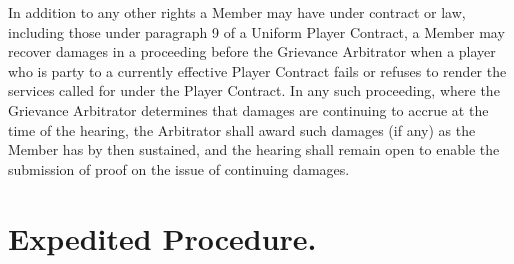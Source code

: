 \documentclass[
]{book}
\begin{document}
In addition to any other rights a Member may have under contract or law, including those under paragraph 9 of a Uniform Player Contract, a Member may recover damages in a proceeding before the Grievance Arbitrator when a player who is party to a currently effective Player Contract fails or refuses to render the services called for under the Player Contract. In any such proceeding, where the Grievance Arbitrator determines that damages are continuing to accrue at the time of the hearing, the Arbitrator shall award such damages (if any) as the Member has by then sustained, and the hearing shall remain open to enable the submission of proof on the issue of continuing damages.

\hypertarget{expedited-procedure.}{%
\section{Expedited Procedure.}\label{expedited-procedure.}}
\end{document}
